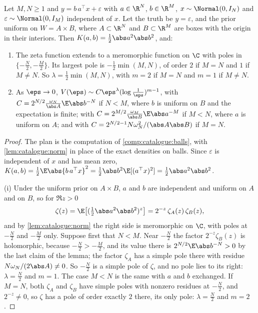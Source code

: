 \begin{refsection}
\begin{theorem}\label{thm:catalogue:rankone}
Let $M,N\ge1$ and $y=b\,a^\top x+\varepsilon$ with $a\in\R^N$, $b\in\R^M$, $x\sim\Normal(0,I_N)$ and $\varepsilon\sim\Normal(0,I_M)$ independent of $x$. Let the truth be $y=\varepsilon$, and the prior uniform on $W=A\times B$, where $A\subset\R^N$ and $B\subset\R^M$ are boxes with the origin in their interiors. Then $K(a,b)=\tfrac12\abs a^2\abs b^2$, and:
\begin{enumerate}
\item The zeta function extends to a meromorphic function on $\C$ with poles in $\{-\frac N2,-\frac M2\}$. Its largest pole is $-\frac12\min(M,N)$, of order $2$ if $M=N$ and $1$ if $M\ne N$. So $\lambda=\frac12\min(M,N)$, with $m=2$ if $M=N$ and $m=1$ if $M\ne N$.
\item As $\eps\to0$, $V(\eps)\sim C\eps^\lambda(\log\frac1\eps)^{m-1}$, with $C=2^{N/2}\frac{\omega_N}{\abs A}\E\abs b^{-N}$ if $N<M$, where $b$ is uniform on $B$ and the expectation is finite; with $C=2^{M/2}\frac{\omega_M}{\abs B}\E\abs a^{-M}$ if $M<N$, where $a$ is uniform on $A$; and with $C=2^{N/2-1}N\omega_N^2/(\abs A\abs B)$ if $M=N$.
\end{enumerate}
\end{theorem}

\begin{proof}
The plan is the computation of \cref{comp:catalogue:balls}, with \cref{lem:catalogue:norm} in place of the exact densities on balls. Since $\varepsilon$ is independent of $x$ and has mean zero, $K(a,b)=\tfrac12\E\abs{b\,a^\top x}^2=\tfrac12\abs b^2\E[(a^\top x)^2]=\tfrac12\abs a^2\abs b^2$.

(i) Under the uniform prior on $A\times B$, $a$ and $b$ are independent and uniform on $A$ and on $B$, so for $\Re z>0$
\[
\zeta(z)=\E\bigl[(\tfrac12\abs a^2\abs b^2)^z\bigr]=2^{-z}\,\zeta_A(z)\,\zeta_B(z),
\]
and by \cref{lem:catalogue:norm} the right side is meromorphic on $\C$, with poles at $-\frac N2$ and $-\frac M2$ only. Suppose first that $N<M$. Near $-\frac N2$ the factor $2^{-z}\zeta_B(z)$ is holomorphic, because $-\frac N2>-\frac M2$, and its value there is $2^{N/2}\E\abs b^{-N}>0$ by the last claim of the lemma; the factor $\zeta_A$ has a simple pole there with residue $N\omega_N/(2\abs A)\ne0$. So $-\frac N2$ is a simple pole of $\zeta$, and no pole lies to its right: $\lambda=\frac N2$ and $m=1$. The case $M<N$ is the same with $a$ and $b$ exchanged. If $M=N$, both $\zeta_A$ and $\zeta_B$ have simple poles with nonzero residues at $-\frac N2$, and $2^{-z}\ne0$, so $\zeta$ has a pole of order exactly $2$ there, its only pole: $\lambda=\frac N2$ and $m=2$.


\end{proof}
\end{refsection}
